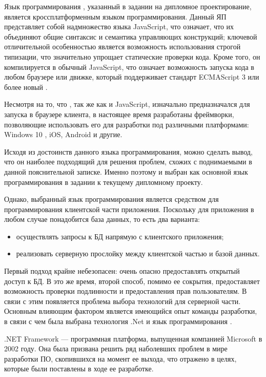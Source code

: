 Язык программирования \typescript, указанный в задании на дипломное проектирование, является кроссплатформенным языком программирования. Данный ЯП представляет собой надмножество языка JavaScript, что означает, что их объединяют общие синтаксис и семантика управляющих конструкций; ключевой отличительной особенностью является возможность использования строгой типизации, что значительно упрощает статические проверки кода. Кроме того, он компилируется в обычный JavaScript, что означает возможность запуска кода в любом браузере или движке, который поддерживает стандарт ECMAScript 3 или более новый \cite{typescript}. 

Несмотря на то, что \typescript, так же как и JavaScript, изначально предназначался для запуска в браузере клиента, в настоящее время разработаны фреймворки, позволяющие использовать его для разработки под различными платформами: Windows 10 \cite{modern_apps}, iOS, Android \cite{nativescript} и другие.

Исходя из достоинств данного языка программирования, можно сделать вывод, что он наиболее подходящий для решения проблем, схожих с поднимаемыми в данной пояснительной записке. Именно поэтому \typescript и выбран как основной язык программирования в задании к текущему дипломному проекту.

Однако, выбранный язык программирования является средством для программирования клиентской части приложения. Поскольку для приложения в любом случае понадобится база данных, то есть два варианта: 

\begin{itemize}
	\item осуществлять запросы к БД напрямую с клиентского приложения;
	\item реализовать серверную прослойку между клиентской частью и базой данных.
\end{itemize}

Первый подход крайне небезопасен: очень опасно предоставлять открытый доступ к БД. В это же время, второй способ, помимо ее сокрытия, предоставляет возможность проверки подлинности и предоставления прав пользователям. В связи с этим появляется проблема выбора технологий для серверной части. Основным влияющим фактором является имеющийся опыт команды разработки, в связи с чем была выбрана технология .Net и язык программирования \csharp. 

.NET Framework — программная платформа, выпущенная компанией Mi\-c\-ro\-soft в 2002 году. Она была призвана решить ряд наболевших проблем в мире разработки ПО, скопившихся на момент ее выхода, что отражено в целях, которые
были поставлены в ходе ее разработке. 

